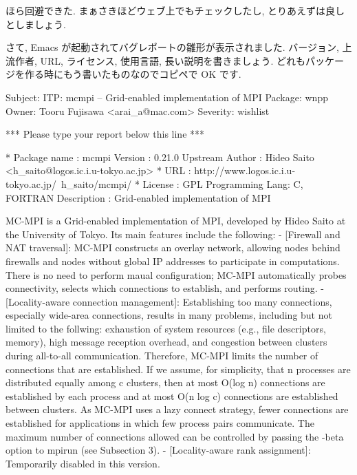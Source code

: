 \documentclass[mingoth,a4paper]{jsarticle}
\begin{document}
\begin{commandline}
ほら回避できた.
まぁさきほどウェブ上でもチェックしたし, とりあえずは良しとしましょう.

さて, Emacs が起動されてバグレポートの雛形が表示されました.
バージョン, 上流作者, URL, ライセンス, 使用言語, 長い説明を書きましょう.
どれもパッケージを作る時にもう書いたものなのでコピペで OK です.

\begin{commandline}
Subject: ITP: mcmpi -- Grid-enabled implementation of MPI
Package: wnpp
Owner: Tooru Fujisawa <arai_a@mac.com>
Severity: wishlist

*** Please type your report below this line ***

* Package name    : mcmpi
  Version         : 0.21.0
  Upstream Author : Hideo Saito <h_saito@logos.ic.i.u-tokyo.ac.jp>
* URL             : http://www.logos.ic.i.u-tokyo.ac.jp/~h_saito/mcmpi/
* License         : GPL
  Programming Lang: C, FORTRAN
  Description     : Grid-enabled implementation of MPI

  MC-MPI is a Grid-enabled implementation of MPI, developed by Hideo
  Saito at the University of Tokyo.  Its main features include the
  following:
  - [Firewall and NAT traversal]: MC-MPI constructs an overlay
    network, allowing nodes behind firewalls and nodes without global
    IP addresses to participate in computations.  There is no need to
    perform maual configuration; MC-MPI automatically probes
    connectivity, selects which connections to establish, and performs
    routing.
  - [Locality-aware connection management]: Establishing too many
    connections, especially wide-area connections, results in many
    problems, including but not limited to the follwing: exhaustion of
    system resources (e.g., file descriptors, memory), high message
    reception overhead, and congestion between clusters during
    all-to-all communication.  Therefore, MC-MPI limits the number of
    connections that are established.  If we assume, for simplicity,
    that n processes are distributed equally among c clusters, then at
    most O(log n) connections are established by each process and at
    most O(n log c) connections are established between clusters.  As
    MC-MPI uses a lazy connect strategy, fewer connections are
    established for applications in which few process pairs
    communicate.  The maximum number of connections allowed can be
    controlled by passing the -beta option to mpirun (see Subsection 3).
  - [Locality-aware rank assignment]: Temporarily disabled in this
    version.
\end{commandline}


\end{commandline}
\end{document}

